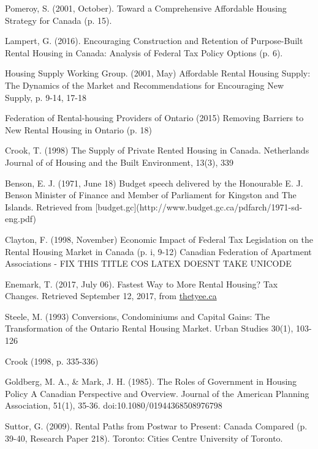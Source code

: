 \begin{thebibliography}{9}
 Pomeroy, S. (2001, October). Toward a Comprehensive Affordable Housing Strategy for Canada (p. 15).

Lampert, G. (2016). Encouraging Construction and Retention of Purpose-Built Rental Housing in Canada: Analysis of Federal Tax Policy Options (p. 6). 

 Housing Supply Working Group. (2001, May) Affordable Rental Housing Supply: The Dynamics of the Market and Recommendations for Encouraging New Supply, p. 9-14, 17-18

 Federation of Rental-housing Providers of Ontario (2015) Removing Barriers to New Rental Housing in Ontario (p. 18)

 Crook, T. (1998) The Supply of Private Rented Housing in Canada. Netherlands Journal of of Housing and the Built Environment, 13(3), 339

 Benson, E. J. (1971, June 18) Budget speech delivered by the Honourable E. J. Benson Minister of Finance and Member of Parliament for Kingston and The Islands. Retrieved from [budget.gc](http://www.budget.gc.ca/pdfarch/1971-sd-eng.pdf)

 Clayton, F. (1998, November) Economic Impact of Federal Tax Legislation on the Rental Housing Market in Canada (p. i, 9-12) Canadian Federation of Apartment Associations - FIX THIS TITLE COS LATEX DOESNT TAKE UNICODE %

  Enemark, T. (2017, July 06). Fastest Way to More Rental Housing? Tax Changes. Retrieved September 12, 2017, from \href{https://thetyee.ca/Opinion/2017/07/06/Tax-Changes-More-Rental-Housing/}{thetyee.ca}

  Steele, M. (1993) Conversions, Condominiums and Capital Gains: The Transformation of the Ontario Rental Housing Market. Urban Studies 30(1), 103-126

 Crook (1998, p. 335-336)

 Goldberg, M. A., \& Mark, J. H. (1985). The Roles of Government in Housing Policy A Canadian Perspective and Overview. Journal of the American Planning Association, 51(1), 35-36. doi:10.1080/01944368508976798

 Suttor, G. (2009). Rental Paths from Postwar to Present: Canada Compared (p. 39-40, Research Paper 218). Toronto: Cities Centre University of Toronto.


\end{thebibliography}
